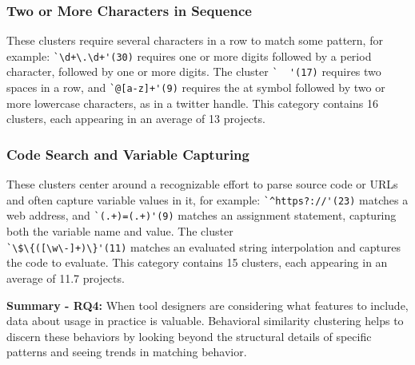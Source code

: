 \subsubsection{Two or More Characters in Sequence}
\label{cluster:multiple}
These clusters require several characters in a row to match some pattern, for example:
\verb!`\d+\.\d+'(30)! requires one or more digits followed by a period character, followed by one or more digits.  The cluster \verb!`  '(17)! requires two spaces in a row,
and \verb!`@[a-z]+'(9)! requires the at symbol followed by two or more lowercase characters, as in a twitter handle.
This category contains 16 clusters, each appearing in an average of 13 projects.


\subsubsection{Code Search and Variable Capturing}
\label{cluster:search}
These clusters center around a recognizable effort to parse source code or URLs and often capture variable values in it, for example:
\verb!`^https?://'(23)! matches a web address, and \verb!`(.+)=(.+)'(9)! matches an assignment statement, capturing both the variable name and value.
The cluster \\ \verb!`\$\{([\w\-]+)\}'(11)! matches an evaluated string interpolation and captures the code to evaluate.
This category contains 15 clusters, each appearing in an average of 11.7 projects.

\vspace{6pt}
\textbf{Summary - RQ4:}
When tool designers are considering what features to include, data about usage in practice is valuable.  Behavioral similarity clustering  helps to discern these behaviors by looking beyond the structural details of specific patterns and seeing trends in  matching behavior. %

